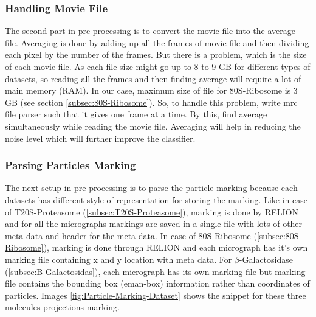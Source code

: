 \documentclass[twoside]{iitbreport}
\begin{document}
\subsubsection{Handling Movie File}
The second part in pre-processing is to convert the movie file into the average file. Averaging is done by adding up all the frames of movie file and then dividing each pixel by the number of the frames. But there is a problem, which is the size of each movie file. As each file size might go up to 8 to 9 GB for different types of datasets, so reading all the frames and then finding average will require a lot of main memory (RAM). In our case, maximum size of file for 80S-Ribosome is 3 GB (see section \ref{subsec:80S-Ribosome}). So, to handle this problem, write mrc file parser such that it gives one frame at a time. By this, find average simultaneously while reading the movie file.  Averaging will help in reducing the noise level which will further improve the classifier.


\subsubsection{Parsing Particles Marking}
The next setup in pre-processing is to parse the particle marking because each datasets has different style of representation for storing the marking. Like in case of T20S-Proteasome (\ref{subsec:T20S-Proteasome}), marking is done by RELION and for all the micrographs markings are saved in a single file with lots of other meta data and header for the meta data. In case of 80S-Ribosome (\ref{subsec:80S-Ribosome}), marking is done through RELION and each micrograph has it's own marking file containing x and y location with meta data. For $\beta$-Galactosidase (\ref{subsec:B-Galactosidas}), each micrograph has its own marking file but marking file contains the bounding box (eman-box) information rather than coordinates of particles. Images \ref{fig:Particle-Marking-Dataset} shows the snippet for these three molecules projections marking.
\end{document}
